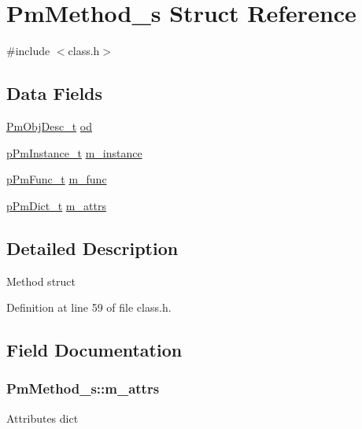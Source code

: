 \hypertarget{struct_pm_method__s}{\section{Pm\-Method\-\_\-s Struct Reference}
\label{struct_pm_method__s}
}


{\ttfamily \#include $<$class.\-h$>$}

\subsection*{Data Fields}
\begin{DoxyCompactItemize}
\item 
\hyperlink{obj_8h_a72d816790acd8eb550fb25268c2b3489}{Pm\-Obj\-Desc\-\_\-t} \hyperlink{struct_pm_method__s_a5ae85884d117be98f6d91d3685f1b2ac}{od}
\item 
\hyperlink{class_8h_acd2432d653ca701b26983cc51d1986f1}{p\-Pm\-Instance\-\_\-t} \hyperlink{struct_pm_method__s_a004b17bf125083834d353bbf15938281}{m\-\_\-instance}
\item 
\hyperlink{func_8h_a31ea34c165a41eee786d036607d224b3}{p\-Pm\-Func\-\_\-t} \hyperlink{struct_pm_method__s_a042fd475b7fb3eaffa623117e8445a0f}{m\-\_\-func}
\item 
\hyperlink{dict_8h_a32b81dc9e05f3a84863319301daf749b}{p\-Pm\-Dict\-\_\-t} \hyperlink{struct_pm_method__s_aa8818c54c82fcf15ee8eab806a884c1d}{m\-\_\-attrs}
\end{DoxyCompactItemize}


\subsection{Detailed Description}
Method struct 

Definition at line 59 of file class.\-h.



\subsection{Field Documentation}
\hypertarget{struct_pm_method__s_aa8818c54c82fcf15ee8eab806a884c1d}{
\subsubsection[{m\-\_\-attrs}]{ Pm\-Method\-\_\-s\-::m\-\_\-attrs}}\label{struct_pm_method__s_aa8818c54c82fcf15ee8eab806a884c1d}
Attributes dict 

